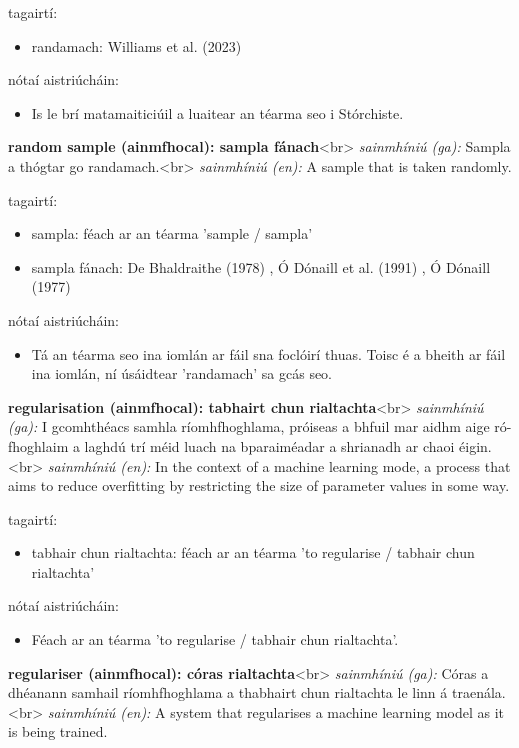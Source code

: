 \documentclass{article}
\begin{document}
tagairtí:
\begin{itemize}
	\item randamach: Williams et al. (2023) \cite{storchiste}
\end{itemize}

nótaí aistriúcháin:
\begin{itemize}
	\item Is le brí matamaiticiúil a luaitear an téarma seo i Stórchiste.
\end{itemize}


\textbf{random sample (ainmfhocal): sampla fánach}<br>
\textit{sainmhíniú (ga):} Sampla a thógtar go randamach.<br>
\textit{sainmhíniú (en):} A sample that is taken randomly.

tagairtí:
\begin{itemize}
	\item sampla: féach ar an téarma 'sample / sampla'
	\item sampla fánach: De Bhaldraithe (1978) \cite{de-bhaldraithe}, Ó Dónaill et al. (1991) \cite{focloir-beag}, Ó Dónaill (1977) \cite{odonaill}
\end{itemize}

nótaí aistriúcháin:
\begin{itemize}
	\item Tá an téarma seo ina iomlán ar fáil sna foclóirí thuas. Toisc é a bheith ar fáil ina iomlán, ní úsáidtear 'randamach' sa gcás seo.
\end{itemize}


\textbf{regularisation (ainmfhocal): tabhairt chun rialtachta}<br>
\textit{sainmhíniú (ga):} I gcomhthéacs samhla ríomhfhoghlama, próiseas a bhfuil mar aidhm aige ró-fhoghlaim a laghdú trí méid luach na bparaiméadar a shrianadh ar chaoi éigin.<br>
\textit{sainmhíniú (en):} In the context of a machine learning mode, a process that aims to reduce overfitting by restricting the size of parameter values in some way.

tagairtí:
\begin{itemize}
	\item tabhair chun rialtachta: féach ar an téarma 'to regularise / tabhair chun rialtachta'
\end{itemize}

nótaí aistriúcháin:
\begin{itemize}
	\item Féach ar an téarma 'to regularise / tabhair chun rialtachta'.
\end{itemize}


\textbf{regulariser (ainmfhocal): córas rialtachta}<br>
\textit{sainmhíniú (ga):} Córas a dhéanann samhail ríomhfhoghlama a thabhairt chun rialtachta le linn á traenála.<br>
\textit{sainmhíniú (en):} A system that regularises a machine learning model as it is being trained.
\end{document}
